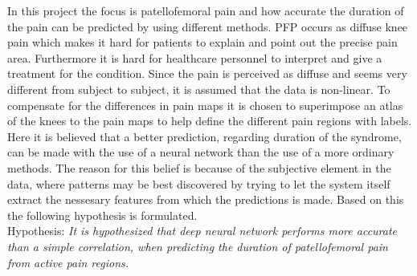 
In this project the focus is patellofemoral pain and how accurate the duration of the pain can be predicted by using different methods. PFP occurs as diffuse knee pain which makes it hard for patients to explain and point out the precise pain area. Furthermore it is hard for healthcare personnel to interpret and give a treatment for the condition. 
Since the pain is perceived as diffuse and seems very different from subject to subject, it is assumed that the data is non-linear. 
To compensate for the differences in pain maps it is chosen to superimpose an atlas of the knees to the pain maps to help define the different pain regions with labels. 
Here it is believed that a better prediction, regarding duration of the syndrome, can be made with the use of a neural network than the use of a more ordinary methods. The reason for this belief is because of the subjective element in the data, where patterns may be best discovered by trying to let the system itself extract the nessesary features from which the predictions is made.    
Based on this the following hypothesis is formulated.\\

\noindent
Hypothesis: \textit{It is hypothesized that deep neural network performs more accurate than a simple correlation, when predicting the duration of patellofemoral pain from active pain regions.}
